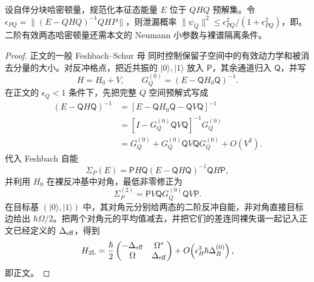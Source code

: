 \begin{proposition}
设自伴分块哈密顿量，规范化本征态能量 $E$ 位于 $QHQ$ 预解集。令 $\epsilon_{PQ}=\|(E-QHQ)^{-1}QHP\|$，则泄漏概率 $\|\psi_Q\|^2\le\epsilon_{PQ}^2/(1+\epsilon_{PQ}^2)$，即。二阶有效两态哈密顿量还需本文的 Neumann 小参数与裸谱隔离条件。
\end{proposition}
\begin{proof}
正文的一般 Feshbach--Schur 母 同时控制保留子空间中的有效动力学和被消去分量的大小。对反冲格点，把近共振的 $|0\rangle,|1\rangle$ 放入 $\mathsf P$，其余通道归入 $\mathsf Q$，并写
\begin{equation*}
 H=H_0+V,
 \qquad
 G_Q^{(0)}=(E-\mathsf QH_0\mathsf Q)^{-1}.
\end{equation*}
在正文的 $\epsilon_Q<1$ 条件下，先把完整 $Q$ 空间预解式写成
\begin{align*}
(E-\mathsf QH\mathsf Q)^{-1}
&=\left[E-\mathsf QH_0\mathsf Q-\mathsf QV\mathsf Q\right]^{-1}\\
&=\left[I-G_Q^{(0)}\mathsf QV\mathsf Q\right]^{-1}G_Q^{(0)}\\
&=G_Q^{(0)}+G_Q^{(0)}\mathsf QV\mathsf QG_Q^{(0)}+O(V^2).
\end{align*}
代入 Feshbach 自能
\begin{equation*}
 \Sigma_P(E)=\mathsf PH\mathsf Q(E-\mathsf QH\mathsf Q)^{-1}\mathsf QH\mathsf P,
\end{equation*}
并利用 $H_0$ 在裸反冲基中对角，最低非零修正为
\begin{equation*}
 \Sigma_P^{(2)}
 =\mathsf PV\mathsf QG_Q^{(0)}\mathsf QV\mathsf P.
\end{equation*}
在目标基 $(|0\rangle,|1\rangle)$ 中，其对角元分别给两态的二阶反冲自能，非对角直接目标边给出 $\hbar\Omega/2$。把两个对角元的平均值减去，并把它们的差连同裸失谐一起记入正文已经定义的 $\Delta_{\rm eff}$，得到
\begin{equation*}
 H_{2\rm L}
 =\frac{\hbar}{2}
 \begin{pmatrix}
 -\Delta_{\rm eff}&\Omega^*\\
 \Omega&\Delta_{\rm eff}
 \end{pmatrix}
 +O\!\left(\epsilon_B^3\hbar\Delta_B^{(0)}\right),
\end{equation*}
即正文。


\end{proof}
